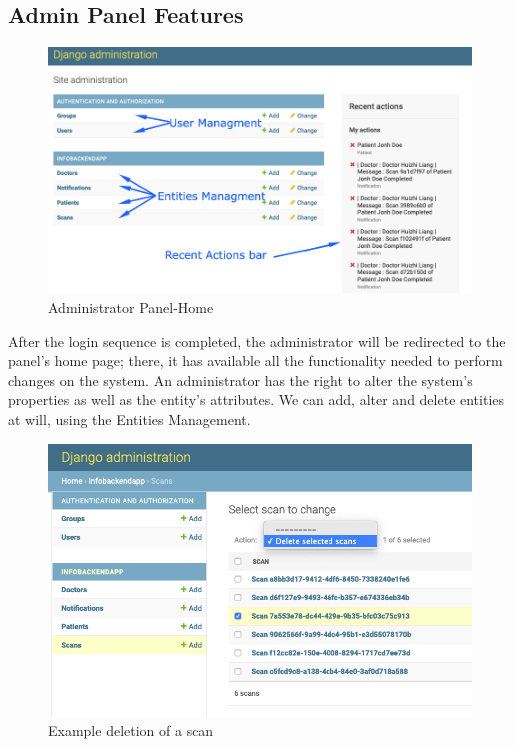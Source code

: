 		\subsection{Admin Panel Features}
			\begin{figure}[H]
				\iftrue
				\caption{Administrator Panel-Home}
				\centering
				\includegraphics[scale=0.3]{figures/admin-panel-home}
				\fi
			\end{figure}
			After the login sequence is completed, the administrator will be redirected to the panel's home page; there, 
			it has available all the functionality needed to perform changes on the system. An administrator 
			has the right to alter the system's properties as well as the entity's attributes. We can add, alter and 
			delete entities at will, using the Entities Management.
			\begin{figure}[H]
				\iftrue
				\caption{Example deletion of a scan}
				\centering
				\includegraphics[scale=0.3]{figures/admin-panel-example-1}
				\fi
			\end{figure}
